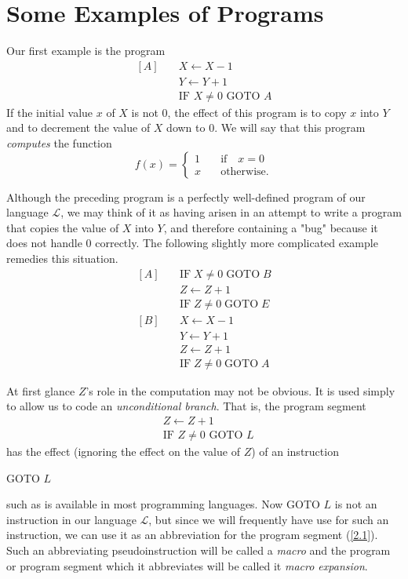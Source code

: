 \documentclass[a4paper,10pt,twoside]{book}
\begin{document}
\section{Some Examples of Programs}

Our first example is the program
\begin{equation*}
    \begin{array}{ll}[A]&\quad X\leftarrow X-1\\ &\quad Y\leftarrow Y+1\\ &\quad\text{IF }X\neq0\text{ GOTO }A\end{array}
\end{equation*}
If the initial value $x$ of $X$ is not 0,  the effect of this program is to copy $x$ into $Y$ and to decrement the value of $X$ down to 0. We will say that this program \textit{computes} the function $$f(x)=\left\{\begin{matrix}1&\quad\text{if}\quad x=0\\x&\quad\text{otherwise.}\end{matrix}\right.$$

Although the preceding program is a perfectly well-defined program of our language $\mathscr{L}$,  we may think of it as having arisen in an attempt to write a program that copies the value of $X$ into $Y$, and therefore containing a "bug" because it does not handle 0 correctly. The following slightly more complicated example remedies this situation.
\begin{equation*}
    \begin{aligned}[A]\quad&\mathrm{IF}\;X\neq0\;\mathrm{GOTO}\;B\\&Z\leftarrow Z+1\\&\mathrm{IF}\;Z\neq0\;\mathrm{GOTO}\;E\\ [B]\quad&X\leftarrow X-1\\&Y\leftarrow Y+1\\&Z\leftarrow Z+1\\&\mathrm{IF}\;Z\neq0\;\mathrm{GOTO}\;A\end{aligned}
\end{equation*}

At first glance $Z$'s role in the computation may not be obvious. It is used simply to allow us to code an \textit{unconditional branch}. That is, the program segment
\begin{equation}
    \begin{aligned}&Z\leftarrow Z+1\\&\text{IF }Z\neq 0\text{ GOTO }L\end{aligned}
    \label{2.1}
\end{equation}
has the effect (ignoring the effect on the value of $Z$) of an instruction
\begin{center}
    GOTO $L$
\end{center}
such as is available in most programming languages. Now GOTO $L$ is not an instruction in our language $\mathscr{L}$, but since we will frequently have use for such an instruction, we can use it as an abbreviation for the program segment (\ref{2.1}). Such an abbreviating pseudoinstruction will be called a \textit{macro} and the program or program segment which it abbreviates will be called it \textit{macro expansion}.
\end{document}
